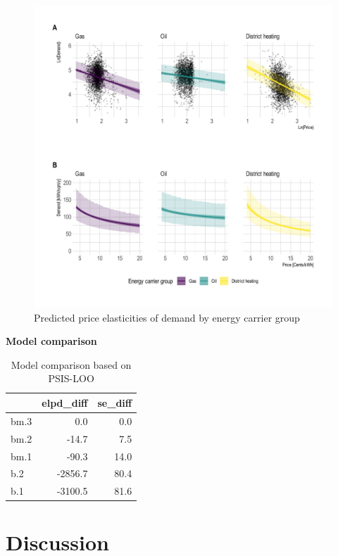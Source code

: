 \documentclass[12pt,twoside]{reedthesis}
\begin{document}
\begin{figure}

{\centering \includegraphics[width=1.04\linewidth]{figure/elasticity_predictions_subsample} 

}

\caption{Predicted price elasticities of demand by energy carrier group}\label{fig:elasticity-predictions-energy-carrier}
\end{figure}
\textbf{Model comparison}
\begin{table}[]
\centering
\caption{Model comparison based on PSIS-LOO}
\label{tab:model-comparison}
\begin{tabular}{@{}lrr@{}}
\toprule
     & \multicolumn{1}{l}{elpd\_diff} & \multicolumn{1}{l}{se\_diff} \\ \midrule
bm.3 & 0.0                            & 0.0                          \\
bm.2 & -14.7                          & 7.5                          \\
bm.1 & -90.3                          & 14.0                         \\
b.2  & -2856.7                        & 80.4                         \\
b.1  & -3100.5                        & 81.6                         \\ \bottomrule
\end{tabular}
\end{table}
\hypertarget{discussion}{%
\chapter{Discussion}\label{discussion}}
\end{document}
